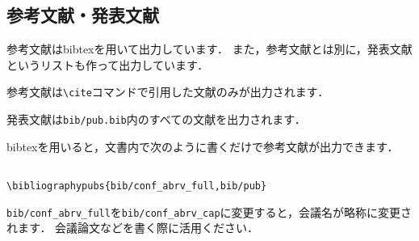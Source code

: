 \subsection{参考文献・発表文献}
参考文献はbibtexを用いて出力しています．
また，参考文献とは別に，発表文献というリストも作って出力しています．

参考文献は\verb|\cite|コマンドで引用した文献のみが出力されます．

発表文献は\verb|bib/pub.bib|内のすべての文献を出力されます．

bibtexを用いると，文書内で次のように書くだけで参考文献が出力できます．
\begin{verbatim}

\bibliographypubs{bib/conf_abrv_full,bib/pub}
\end{verbatim}
\verb|bib/conf_abrv_full|を\verb|bib/conf_abrv_cap|に変更すると，会議名が略称に変更されます．
会議論文などを書く際に活用ください．
